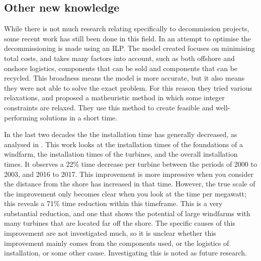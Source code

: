 \documentclass[a4paper,12pt]{article}
\begin{document}
\subsection{Other new knowledge} \label{ss:othnew}
While there is not much research relating specifically to decommission projects, some recent work has still been done in this field. In \cite{irawan2019optimisation} an attempt to optimise the decommissioning is made using an ILP. The model created focuses on minimising total costs, and takes many factors into account, such as both offshore and onshore logistics, components that can be sold and components that can be recycled. This broadness means the model is more accurate, but it also means they were not able to solve the exact problem. For this reason they tried various relaxations, and proposed a matheuristic method in which some integer constraints are relaxed. They use this method to create feasible and well-performing solutions in a short time.

\bigskip

In the last two decades the the installation time has generally decreased, as analysed in \cite{lacal2018offshore}. This work looks at the installation times of the foundations of a windfarm, the installation times of the turbines, and the overall installation times. It observes a 22\% time decrease per turbine between the periods of 2000 to 2003, and 2016 to 2017. This improvement is more impressive when you consider the distance from the shore has increased in that time. However, the true scale of the improvement only becomes clear when you look at the time per megawatt; this reveals a 71\% time reduction within this timeframe. This is a very substantial reduction, and one that shows the potential of large windfarms with many turbines that are located far off the shore. The specific causes of this improvement are not investigated much, so it is unclear whether this improvement mainly comes from the components used, or the logistics of installation, or some other cause. Investigating this is noted as future research. 

\bigskip
\end{document}

